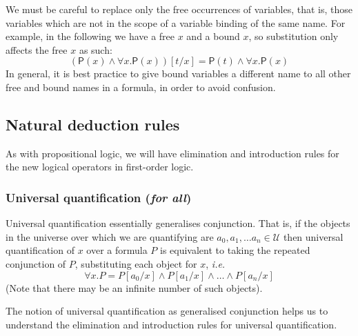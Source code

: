 \documentclass{article}
\theoremstyle{definition}
\newcommand{\rel}[1]{\mathsf{#1}}
\newcommand{\ie}{\emph{i.e.}}
\begin{document}
We must be careful to replace only the free
occurrences of variables, that is, those variables which are not in
the scope of a variable binding of the same name. For example, in the
following we have a free $x$ and a bound $x$, so substitution only
affects the free $x$ as such:
%
\begin{equation*}
(\rel{P}(x) \wedge \forall x . \rel{P}(x))[t/x] 
= \rel{P}(t) \wedge \forall x . \rel{P}(x)
\end{equation*}
%
In general, it is best practice to give bound variables a different name
to all other free and bound names in a formula, in order to avoid confusion.

\subsection{Natural deduction rules}

As with propositional logic, we will have elimination and introduction
rules for the new logical operators in first-order logic.

\subsubsection{Universal quantification (\emph{for all})}

Universal quantification essentially generalises conjunction.  That
is, if the objects in the universe over which we are quantifying are
$a_0, a_1, \ldots a_n \in \mathcal{U}$ then universal quantification
of $x$ over a formula $P$ is equivalent to taking the repeated
conjunction of $P$, substituting each object for $x$, \ie{}
%
\begin{equation}
\forall x . P = P[a_0/x] \wedge P[a_1/x] \wedge
\ldots \wedge P[a_{n}/x]
\label{eq:forall-meaning}
\end{equation}
%
(Note that there may be an infinite number of such objects).

The notion of universal quantification as generalised conjunction
helps us to understand the elimination and introduction rules for universal
quantification.
\end{document}
